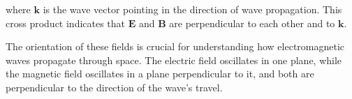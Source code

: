where \(\mathbf{k}\) is the wave vector pointing in the direction of wave propagation. This cross product indicates that \(\mathbf{E}\) and \(\mathbf{B}\) are perpendicular to each other and to \(\mathbf{k}\).

The orientation of these fields is crucial for understanding how electromagnetic waves propagate through space. The electric field oscillates in one plane, while the magnetic field oscillates in a plane perpendicular to it, and both are perpendicular to the direction of the wave's travel.

